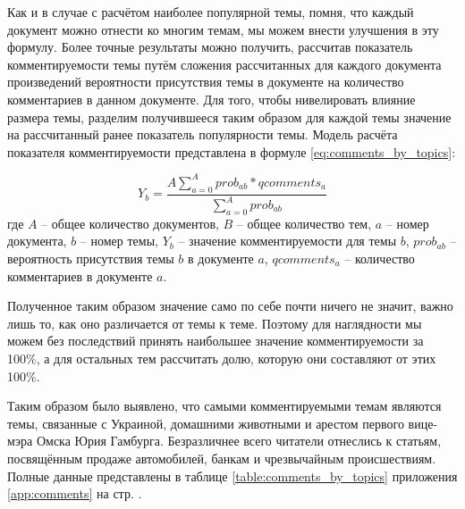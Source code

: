 Как и в случае с расчётом наиболее популярной темы, помня, что каждый документ можно отнести ко многим темам, мы можем внести улучшения в эту формулу. Более точные результаты можно получить, рассчитав показатель комментируемости темы путём сложения рассчитанных для каждого документа произведений вероятности присутствия темы в документе на количество комментариев в данном документе. Для того, чтобы нивелировать влияние размера темы, разделим получившееся таким образом для каждой темы значение на рассчитанный ранее показатель популярности темы. Модель расчёта показателя комментируемости представлена в формуле \ref{eq:comments_by_topics}:

\begin{equation}\label{eq:comments_by_topics}
Y_b = \frac{A \sum \limits_{a=0}^{A}prob_{ab} * qcomments_a}{\sum_{a=0}^{A} prob_{ab}}
\end{equation}
где $A$ -- общее количество документов, $B$ -- общее количество тем, $a$ -- номер документа, $b$ -- номер темы, $Y_b$ -- значение комментируемости для темы $b$, $prob_{ab}$ -- вероятность присутствия темы $b$ в документе $a$, $qcomments_a$ -- количество комментариев в документе $a$.

Полученное таким образом значение само по себе почти ничего не значит, важно лишь то, как оно различается от темы к теме. Поэтому для наглядности мы можем без последствий принять наибольшее значение комментируемости за 100\%, а для остальных тем рассчитать долю, которую они составляют от этих 100\%.

Таким образом было выявлено, что самыми комментируемыми темам являются темы, связанные с Украиной, домашними животными и арестом первого вице-мэра Омска Юрия Гамбурга. Безразличнее всего читатели отнеслись к статьям, посвящённым продаже автомобилей, банкам и чрезвычайным происшествиям. Полные данные представлены в таблице \ref{table:comments_by_topics} приложения \ref{app:comments} на стр. \pageref{table:comments_by_topics}.


